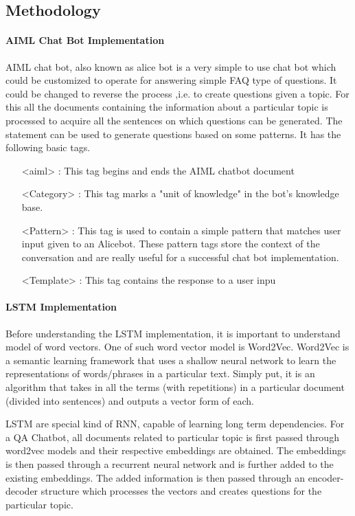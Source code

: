 \subsection{Methodology}
\paragraph{AIML Chat Bot Implementation}
AIML chat bot, also known as alice bot is a very simple to use chat bot which
could be customized to operate for answering simple FAQ type of questions. It
could be changed to reverse the process ,i.e. to create questions given a topic.
For this all the documents containing the information about a particular topic
is processed to acquire all the sentences on which questions can be generated.
The statement can be used to generate questions based on some patterns. It has
the following basic tags.

\begin{itemize}[align = left]
	\item[<aiml>]: This tag begins and ends the AIML chatbot document

	\item[<Category>]: This tag marks a "unit of knowledge" in the bot’s knowledge base.

	\item[<Pattern>]: This tag is used to contain a simple pattern that matches user input
given to an Alicebot. These pattern tags store the context of the conversation
and are really useful for a successful chat bot implementation.

	\item[<Template>]: This tag contains the response to a user inpu

\end{itemize}

\paragraph{LSTM Implementation}

Before understanding the LSTM implementation, it is important to understand
model of word vectors. One of such word vector model is Word2Vec. Word2Vec is a
semantic learning framework that uses a shallow neural network to learn the
representations of words/phrases in a particular text. Simply put, it is an
algorithm that takes in all the terms (with repetitions) in a particular
document (divided into sentences) and outputs a vector form of each.

LSTM are special kind of RNN, capable of learning long term dependencies. For a
QA Chatbot, all documents related to particular topic is first passed through
word2vec models and their respective embeddings are obtained. The embeddings is
then passed through a recurrent neural network and is further added to the
existing embeddings. The added information is then passed through an
encoder-decoder structure which processes the vectors and creates questions for
the particular topic.

